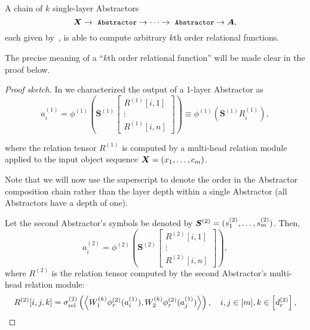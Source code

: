 \begin{lemma}\label{lemma:function_class_composed_abstractors}
	\hphantom{~}
	A chain of \(k\) single-layer Abstractors 
	\[\bm{X} \to \module{Abstractor} \to \cdots \to \module{Abstractor} \to \bm{A},\]
	each given by~, is able to compute arbitrary \(k\)th order relational functions.
\end{lemma}
The precise meaning of a ``\(k\)th order relational function'' will be made clear in the proof below.
\begin{proof}[Proof sketch]
	In  we characterized the output of a 1-layer Abstractor as
	\begin{equation*}
		a_i^{(1)} = \phi^{(1)}\left(\bm{S}^{(1)} \begin{bmatrix}R^{(1)}[i,1] \\ \vdots \\ R^{(1)}[i,n]\end{bmatrix}\right) \equiv \phi^{(1)}\left( \bm{S}^{(1)} R_i^{(1)}\right),
	\end{equation*}

	where the relation tensor $R^{(1)}$ is computed by a multi-head relation module applied to the input object sequence $\bm{X} = (x_1, \ldots, c_m)$.

	Note that we will now use the superscript to denote the order in the Abstractor composition chain rather than the layer depth within a single Abstractor (all  Abstractors have a depth of one).

	Let the second Abstractor's symbols be denoted by \(\bm{S}^{(2)} = (s_1^{(2)}, \ldots, s_m^{(2)})\). Then,
	\begin{equation*}
		a_i^{(2)} = \phi^{(2)}\left(\bm{S}^{(2)} \begin{bmatrix}R^{(2)}[i,1] \\ \vdots \\ R^{(2)}[i,n]\end{bmatrix}\right),
	\end{equation*}
	where $R^{(2)}$ is the relation tensor computed by the second Abstractor's multi-head relation module:
	\begin{equation*}
		R^{(2)}[i, j, k] = \sigma_{\mathrm{rel}}^{(2)}\left(\left\langle W_1^{(k)} \phi_r^{(2)}(a_i^{(1)}), W_2^{(k)} \phi_r^{(2)}(a_j^{(1)}) \right\rangle\right), \quad i,j \in [\m], k \in \left[d_r^{(2)}\right],
	\end{equation*}


\end{proof}
